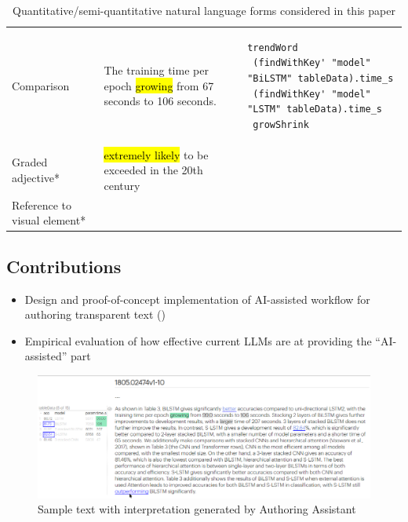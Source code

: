 \begin{table}[!ht]
\begin{tabular}{>{\raggedright\arraybackslash}p{2cm} >{\raggedright\arraybackslash}p{5cm} >{\raggedright\arraybackslash}p{6cm}}
        Comparison
        & The training time per epoch \hl{growing} from 67 seconds to 106 seconds. &
        \begin{lstlisting}[language=Fluid,numbers=none]
trendWord
 (findWithKey' "model" "BiLSTM" tableData).time_s
 (findWithKey' "model" "LSTM" tableData).time_s
 growShrink
        \end{lstlisting} \\
        Graded adjective*            & \hl{extremely likely} to be exceeded in the 20th century               & ~                             \\
        Reference to visual element*                            & ~                & ~                             \\
        \hline
    \end{tabular}
    \caption{Quantitative/semi-quantitative natural language forms considered in this paper}
    \label{tab:fluid_examples}
\end{table}
\subsection{Contributions}

\begin{itemize}
    \item Design and proof-of-concept implementation of AI-assisted workflow for authoring transparent text
    ()
    \item Empirical evaluation of how effective current LLMs are at providing the ``AI-assisted'' part
\end{itemize}

\begin{figure}
    \centering
    \includegraphics[width=\linewidth]{fig/scigen-mr-1906.02780-10.png}
    \caption{Sample text with interpretation generated by Authoring Assistant}\label{fig:scigen-example-website}
\end{figure}
